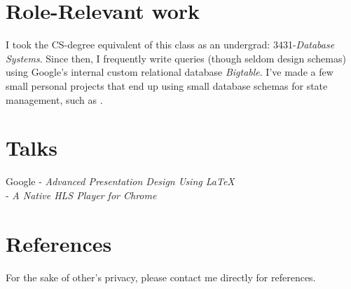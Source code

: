 \documentclass[11pt]{article}
\begin{document}
\section*{Role-Relevant work}
I took the CS-degree equivalent of this class as an undergrad: 3431-\textit{Database Systems}.
Since then, I frequently write queries (though seldom design schemas) using Google's internal
custom relational database \textit{Bigtable}. I've made a few small personal projects that end
up using small database schemas for state management, such as .

\section*{Talks}
 Google - \textit{Advanced Presentation Design Using \LaTeX}\\
  - \textit{A Native HLS Player for Chrome}

\section*{References}
For the sake of other's privacy, please contact me directly for references.
\end{document}
